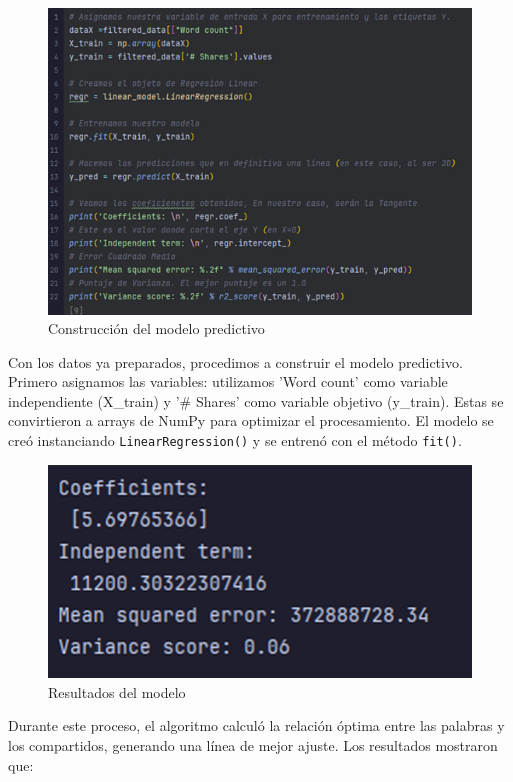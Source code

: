 \documentclass[12pt, a4paper]{article}
\begin{document}
\begin{figure}[H]
    \centering
    \includegraphics[width=1.0\textwidth]{Actividad-9/Imagen9.png}
    \caption{Construcción del modelo predictivo}
\end{figure}

Con los datos ya preparados, procedimos a construir el modelo predictivo. Primero asignamos las variables: utilizamos 'Word count' como variable independiente (X\_train) y '\# Shares' como variable objetivo (y\_train). Estas se convirtieron a arrays de NumPy para optimizar el procesamiento. El modelo se creó instanciando \texttt{LinearRegression()} y se entrenó con el método \texttt{fit()}.

\begin{figure}[H]
    \centering
    \includegraphics[width=1.0\textwidth]{Actividad-9/Imagen10.png}
    \caption{Resultados del modelo}
\end{figure}

Durante este proceso, el algoritmo calculó la relación óptima entre las palabras y los compartidos, generando una línea de mejor ajuste. Los resultados mostraron que:
\end{document}
